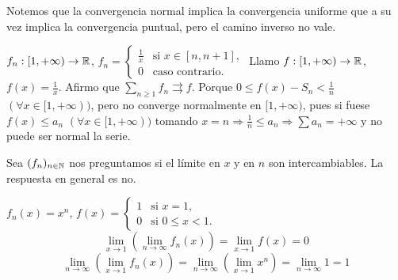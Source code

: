 Notemos que la convergencia normal implica la convergencia uniforme que a su vez implica la convergencia puntual, pero el camino inverso no vale.

\begin{eg}
  $f_n: [1, +\infty) \to \mathbb{R}$, $f_n = \begin{cases}
      \frac{1}{x} & \text{si } x \in [n, n+1], \\
      0           & \text{caso contrario.}
    \end{cases}$
  Llamo $f: [1, +\infty) \to \mathbb{R}$, $f(x) = \frac{1}{x}$. Afirmo que $\sum_{n \geq 1} f_n \rightrightarrows f$. Porque $0 \leq f(x) - S_n < \frac{1}{n}$ $(\forall x \in [1, +\infty))$, pero no converge normalmente en $[1, +\infty)$, pues si fuese $f(x) \leq a_n$ $(\forall x \in [1, +\infty))$ tomando $x = n \Rightarrow \frac{1}{n} \leq a_n \Rightarrow \sum a_n = +\infty$ y no puede ser normal la serie.
\end{eg}

\begin{note}
  Sea $(f_n)_{n \in \mathbb{N}}$ nos preguntamos si el límite en $x$ y en $n$ son intercambiables. La respuesta en general es no.
\end{note}

\begin{eg}
  $f_n(x) = x^n$, $f(x) = \begin{cases}
      1 & \text{si } x = 1,        \\
      0 & \text{si } 0 \leq x < 1.
    \end{cases}$ \begin{equation}
    \lim_{x \to 1} (\lim_{n \to \infty} f_n(x)) = \lim_{x \to 1} f(x) = 0
  \end{equation}
  \begin{equation}
    \lim_{n \to \infty} (\lim_{x \to 1} f_n(x)) = \lim_{n \to \infty} (\lim_{x \to 1} x^n) = \lim_{n \to \infty} 1 = 1
  \end{equation}
\end{eg}


